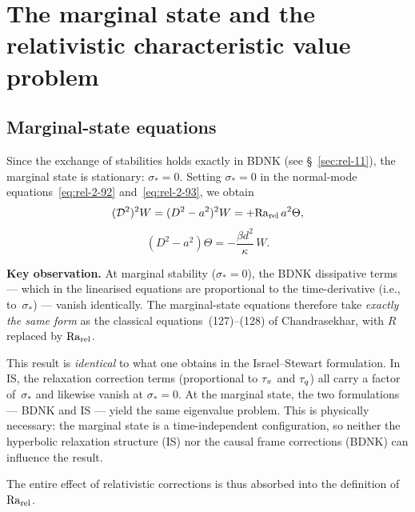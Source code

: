\section{The marginal state and the relativistic characteristic value
  problem}
\label{sec:rel-12}

\subsection{Marginal-state equations}
\label{sec:rel-12a}

Since the exchange of stabilities holds exactly in BDNK
(see \S~\ref{sec:rel-11}), the marginal state is stationary:
$\sigma_* = 0$.  Setting $\sigma_* = 0$ in the normal-mode
equations~\eqref{eq:rel-2-92} and~\eqref{eq:rel-2-93}, we obtain
\begin{equation}
\label{eq:rel-2-127}
(\mathcal{D}^2)^2 W
= (D^2-a^2)^2 W
= +\mathrm{Ra}_{\mathrm{rel}}\, a^2 \Theta,
\end{equation}
\begin{equation}
\label{eq:rel-2-128}
(D^2-a^2)\Theta = -\frac{\beta d^2}{\kappa}\, W.
\end{equation}

\begin{relcorrection}
\textbf{Key observation.}  At marginal stability ($\sigma_* = 0$), the
BDNK dissipative terms --- which in the linearised equations are
proportional to the time-derivative (i.e., to~$\sigma_*$) --- vanish
identically.  The marginal-state equations therefore take \emph{exactly
the same form} as the classical equations~(127)--(128) of Chandrasekhar,
with $R$ replaced by $\mathrm{Ra}_{\mathrm{rel}}$.

This result is \emph{identical} to what one obtains in the Israel--Stewart
formulation.  In IS, the relaxation correction terms (proportional to
$\tau_{\pi}$ and $\tau_{q}$) all carry a factor of~$\sigma_*$ and likewise
vanish at $\sigma_* = 0$.  At the marginal state, the two formulations ---
BDNK and IS --- yield the same eigenvalue problem.  This is physically
necessary: the marginal state is a time-independent configuration, so
neither the hyperbolic relaxation structure (IS) nor the causal frame
corrections (BDNK) can influence the result.

The entire effect of relativistic corrections is thus absorbed into the
definition of $\mathrm{Ra}_{\mathrm{rel}}$.
\end{relcorrection}

